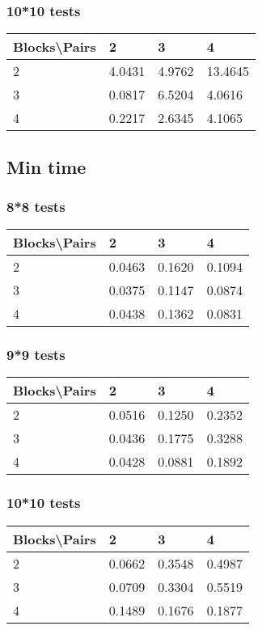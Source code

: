 \documentclass[12pt, a4paper]{article}
\begin{document}
			\subsubsection{10*10 tests}

				\begin{tabular}[h]{|l|l|l|l|}
				\hline
				Blocks\textbackslash Pairs & 2 & 3 & 4 \\
				\hline
				2 & 4.0431 & 4.9762 & 13.4645 \\
				\hline
				3 & 0.0817 & 6.5204 & 4.0616 \\
				\hline
				4 & 0.2217 & 2.6345 & 4.1065 \\
				\hline
				\end{tabular}


		\subsection{Min time}

			\subsubsection{8*8 tests}

				\begin{tabular}[h]{|l|l|l|l|}
				\hline
				Blocks\textbackslash Pairs & 2 & 3 & 4 \\
				\hline
				2 & 0.0463 & 0.1620 & 0.1094 \\
				\hline
				3 &	0.0375 & 0.1147 & 0.0874 \\
				\hline
				4 & 0.0438 & 0.1362 & 0.0831 \\
				\hline
				\end{tabular}

			\subsubsection{9*9 tests}

				\begin{tabular}[h]{|l|l|l|l|}
				\hline
				Blocks\textbackslash Pairs & 2 & 3 & 4 \\
				\hline
				2 & 0.0516 & 0.1250 & 0.2352 \\
				\hline
				3 & 0.0436 & 0.1775 & 0.3288 \\
				\hline
				4 & 0.0428 & 0.0881 & 0.1892 \\
				\hline
				\end{tabular}

			\subsubsection{10*10 tests}

				\begin{tabular}[h]{|l|l|l|l|}
				\hline
				Blocks\textbackslash Pairs & 2 & 3 & 4 \\
				\hline
				2 & 0.0662 & 0.3548 & 0.4987 \\
				\hline
				3 & 0.0709 & 0.3304 & 0.5519 \\
				\hline
				4 & 0.1489 & 0.1676 & 0.1877 \\
				\hline
				\end{tabular}


	
\end{document}
